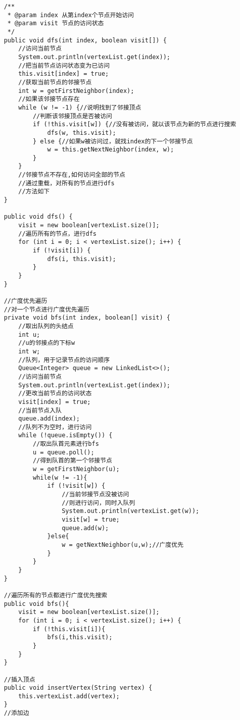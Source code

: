 \documentclass[a4paper]{report}
\begin{document}
\begin{lstlisting}
    /**
     * @param index 从第index个节点开始访问
     * @param visit 节点的访问状态
     */
    public void dfs(int index, boolean visit[]) {
        //访问当前节点
        System.out.println(vertexList.get(index));
        //把当前节点访问状态变为已访问
        this.visit[index] = true;
        //获取当前节点的邻接节点
        int w = getFirstNeighbor(index);
        //如果该邻接节点存在
        while (w != -1) {//说明找到了邻接顶点
            //判断该邻接顶点是否被访问
            if (!this.visit[w]) {//没有被访问，就以该节点为新的节点进行搜索
                dfs(w, this.visit);
            } else {//如果w被访问过，就找index的下一个邻接节点
                w = this.getNextNeighbor(index, w);
            }
        }
        //邻接节点不存在,如何访问全部的节点
        //通过重载，对所有的节点进行dfs
        //方法如下
    }

    public void dfs() {
        visit = new boolean[vertexList.size()];
        //遍历所有的节点，进行dfs
        for (int i = 0; i < vertexList.size(); i++) {
            if (!visit[i]) {
                dfs(i, this.visit);
            }
        }
    }

    //广度优先遍历
    //对一个节点进行广度优先遍历
    private void bfs(int index, boolean[] visit) {
        //取出队列的头结点
        int u;
        //u的邻接点的下标w
        int w;
        //队列，用于记录节点的访问顺序
        Queue<Integer> queue = new LinkedList<>();
        //访问当前节点
        System.out.println(vertexList.get(index));
        //更改当前节点的访问状态
        visit[index] = true;
        //当前节点入队
        queue.add(index);
        //队列不为空时，进行访问
        while (!queue.isEmpty()) {
            //取出队首元素进行bfs
            u = queue.poll();
            //得到队首的第一个邻接节点
            w = getFirstNeighbor(u);
            while(w != -1){
                if (!visit[w]) {
                    //当前邻接节点没被访问
                    //则进行访问，同时入队列
                    System.out.println(vertexList.get(w));
                    visit[w] = true;
                    queue.add(w);
                }else{
                    w = getNextNeighbor(u,w);//广度优先
                }
            }
        }
    }

    //遍历所有的节点都进行广度优先搜索
    public void bfs(){
        visit = new boolean[vertexList.size()];
        for (int i = 0; i < vertexList.size(); i++) {
            if (!this.visit[i]){
                bfs(i,this.visit);
            }
        }
    }

    //插入顶点
    public void insertVertex(String vertex) {
        this.vertexList.add(vertex);
    }
    //添加边


\end{lstlisting}
\end{document}
